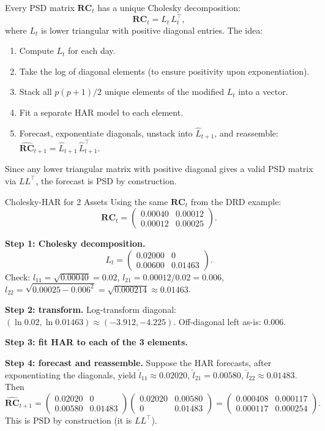 \begin{keyidea}
Every PSD matrix $\mathbf{RC}_t$ has a unique Cholesky decomposition:
\[
  \mathbf{RC}_t = L_t\, L_t^\top,
\]
where $L_t$ is lower triangular with positive diagonal entries. The idea:
\begin{enumerate}[nosep]
  \item Compute $L_t$ for each day.
  \item Take the log of diagonal elements (to ensure positivity upon
        exponentiation).
  \item Stack all $p(p+1)/2$ unique elements of the modified $L_t$ into a
        vector.
  \item Fit a separate HAR model to each element.
  \item Forecast, exponentiate diagonals, unstack into $\hat{L}_{t+1}$,
        and reassemble:
        $\widehat{\mathbf{RC}}_{t+1} = \hat{L}_{t+1}\,\hat{L}_{t+1}^\top$.
\end{enumerate}
Since any lower triangular matrix with positive diagonal gives a valid PSD
matrix via $LL^\top$, the forecast is PSD by construction.
\end{keyidea}

\begin{workedexample}{Cholesky-HAR for 2 Assets}
Using the same $\mathbf{RC}_t$ from the DRD example:
\[
  \mathbf{RC}_t = \begin{pmatrix} 0.00040 & 0.00012 \\ 0.00012 & 0.00025 \end{pmatrix}.
\]

\textbf{Step 1: Cholesky decomposition.}
\[
  L_t = \begin{pmatrix} 0.02000 & 0 \\ 0.00600 & 0.01463 \end{pmatrix}.
\]
Check: $l_{11} = \sqrt{0.00040} = 0.02$,\;
$l_{21} = 0.00012 / 0.02 = 0.006$,\;
$l_{22} = \sqrt{0.00025 - 0.006^2} = \sqrt{0.000214} \approx 0.01463$.

\textbf{Step 2: transform.}
Log-transform diagonal: $(\ln 0.02, \ln 0.01463) \approx (-3.912, -4.225)$.
Off-diagonal left as-is: $0.006$.

\textbf{Step 3: fit HAR to each of the 3 elements.}

\textbf{Step 4: forecast and reassemble.}
Suppose the HAR forecasts, after exponentiating the diagonals, yield
$\hat{l}_{11} \approx 0.02020$, $\hat{l}_{21} = 0.00580$, $\hat{l}_{22} \approx 0.01483$.
Then
\[
  \widehat{\mathbf{RC}}_{t+1}
  = \begin{pmatrix} 0.02020 & 0 \\ 0.00580 & 0.01483 \end{pmatrix}
    \begin{pmatrix} 0.02020 & 0.00580 \\ 0 & 0.01483 \end{pmatrix}
  = \begin{pmatrix} 0.000408 & 0.000117 \\ 0.000117 & 0.000254 \end{pmatrix}.
\]
This is PSD by construction (it is $LL^\top$).
\end{workedexample}


